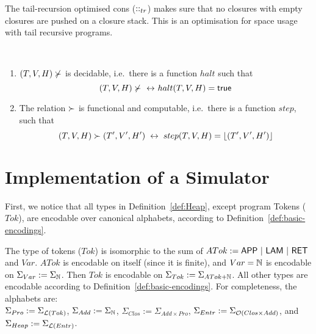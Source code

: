 The tail-recursion optimised cons ($\mathbin{::}_{tr}$) makes sure that no closures with empty closures are pushed on a closure stack.  This is an
optimisation for space usage with tail recursive programs.

\begin{lemma}
  \label{lem:heap-red}
  ~
  \begin{enumerate}
  \item \label{lem:halt_state_dec}%
    $(T,V,H)\nsucc$ is decidable, i.e.\ there is a function $halt$ such that
    \[
      (T,V,H) \nsucc ~\mathbin{\leftrightarrow}~ halt(T,V,H) = \mathsf{true}
    \]
  \item \label{lem:step-iff}%
    The relation $\succ$ is functional and computable, i.e.\ there is a function $step$, such that
    \[
      (T,V,H) \succ (T',V',H') ~\mathbin{\leftrightarrow}~ step(T,V,H)=\left\lfloor {(T',V',H')} \right\rfloor
    \]
  \end{enumerate}
\end{lemma}


\section{Implementation of a Simulator}
\label{sec:heap-implementation}

First, we notice that all types in Definition~\ref{def:Heap}, except program Tokens ($Tok$), are encodable over canonical alphabets, according to
Definition~\ref{def:basic-encodings}.
\begin{definition}
  \label{def:Heap-encode}
  The type of tokens ($Tok$) is isomorphic to the sum of $ATok := \mathsf{APP} ~|~ \mathsf{LAM} ~|~ \mathsf{RET}$ and $Var$.  $ATok$ is encodable on itself (since
  it is finite), and $Var = \mathbb{N}$ is encodable on $\Sigma_{Var} := \Sigma_{\mathbb{N}}$.  Then $Tok$ is encodable on $\Sigma_{Tok} := \Sigma_{ATok+\mathbb{N}}$.
  All other types are encodable according to Definition~\ref{def:basic-encodings}.
  For completeness, the alphabets are:\\
  $\Sigma_{Pro} := \Sigma_{\mathcal{L}(Tok)}$, $\Sigma_{Add} := \Sigma_{\mathbb{N}}$, $\Sigma_{Clos}:=\Sigma_{Add \times Pro}$,
  $\Sigma_{Entr} := \Sigma_{\mathcal{O}(Clos \times Add)}$, and $\Sigma_{Heap} := \Sigma_{\mathcal{L}(Entr)}$.
\end{definition}


